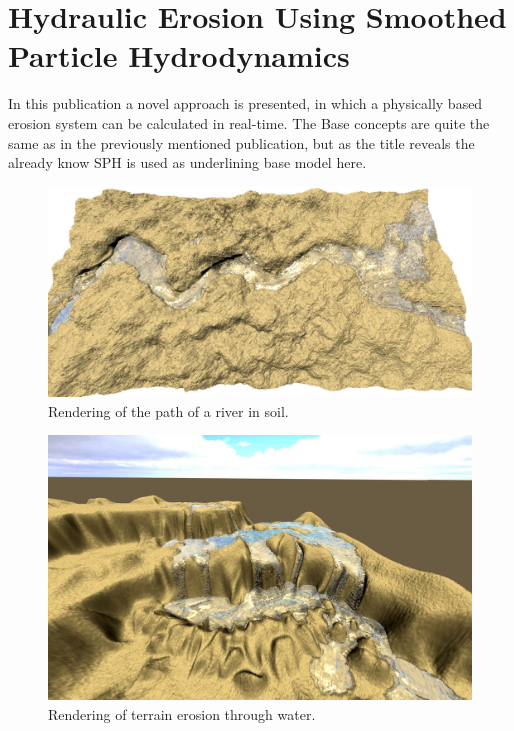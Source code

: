\section{Hydraulic Erosion Using Smoothed Particle Hydrodynamics}
In this publication \cite{krivstof2009hydraulic} a novel approach is presented, in which a physically based erosion system can be calculated in real-time. The Base concepts are quite the same as in the previously mentioned publication, but as the title reveals the already know SPH is used as underlining base model here.

\begin{figure}[htb]
	\centering
	\includegraphics[width=\linewidth]{KBKS09/illustration1.jpg}
	\caption{Rendering of the path of a river in soil.}
	\label{fig:illustration1}
\end{figure}


\begin{figure}[htb]
	\centering
	\includegraphics[width=\linewidth]{KBKS09/illustration2.jpg}
	\caption{Rendering of terrain erosion through water.}
	\label{fig:illustration2}
\end{figure}


